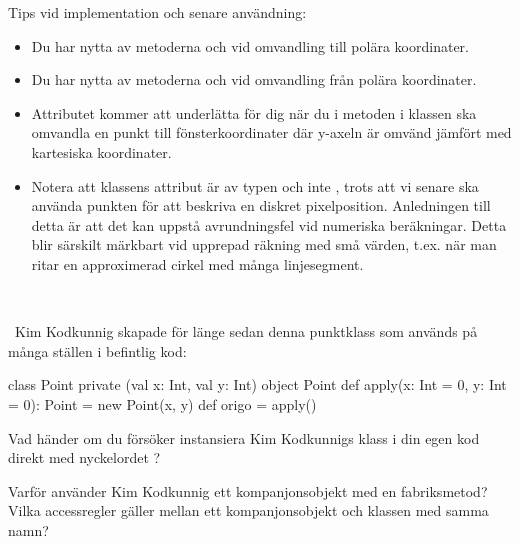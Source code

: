 \noindent Tips vid implementation och senare användning:
\begin{itemize}
\item Du har nytta av metoderna  och  vid omvandling till polära koordinater.

\item Du har nytta av metoderna  och  vid omvandling från polära koordinater.

\item Attributet  kommer att underlätta för dig när du i metoden  i klassen  ska omvandla en punkt till fönsterkoordinater där y-axeln är omvänd jämfört med kartesiska koordinater.

\item Notera att klassens attribut är av typen  och inte , trots att vi senare ska använda punkten för att beskriva en diskret pixelposition. Anledningen till detta är att det kan uppstå avrundningsfel vid numeriska beräkningar. Detta blir särskilt märkbart vid upprepad räkning med små värden, t.ex. när man ritar en approximerad cirkel med många linjesegment.
\end{itemize}

\SOLUTION

\TaskSolved \what~\TODO

\QUESTEND



\AdvancedTasks %


\QUESTBEGIN

\Task \what~Kim Kodkunnig skapade för länge sedan denna punktklass som används på många ställen i befintlig kod:

\begin{Code}
class Point private (val x: Int, val y: Int)
object Point {
  def apply(x: Int = 0, y: Int = 0): Point = new Point(x, y)
  def origo = apply()
}
\end{Code}

\Subtask Vad händer om du försöker instansiera Kim Kodkunnigs klass i din egen kod direkt med nyckelordet ?

\Subtask Varför använder Kim Kodkunnig ett kompanjonsobjekt med en fabriksmetod? Vilka accessregler gäller mellan ett kompanjonsobjekt och klassen med samma namn?

